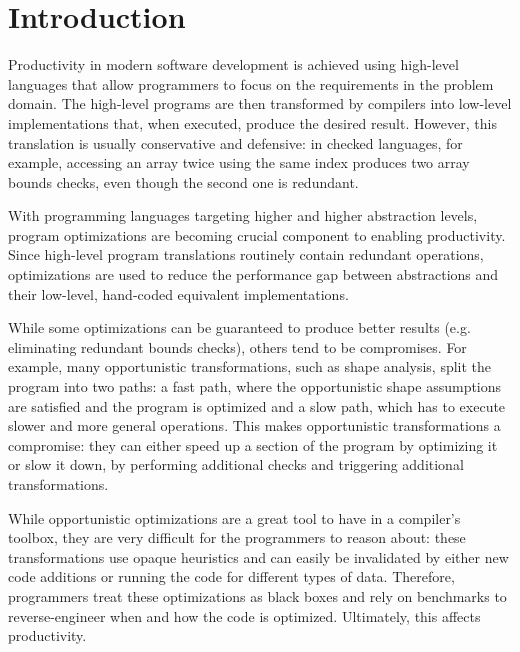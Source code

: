 \section{Introduction}
\label{sec:intro}


Productivity in modern software development is achieved using high-level languages that allow programmers to focus on the requirements in the problem domain. The high-level programs are then transformed by compilers into low-level implementations that, when executed, produce the desired result. However, this translation is usually conservative and defensive: in checked languages, for example, accessing an array twice using the same index produces two array bounds checks, even though the second one is redundant.

With programming languages targeting higher and higher abstraction levels, program optimizations are becoming crucial component to enabling productivity. Since high-level program translations routinely contain redundant operations, optimizations are used to reduce the performance gap between abstractions and their low-level, hand-coded equivalent implementations.

While some optimizations can be guaranteed to produce better results (e.g. eliminating redundant bounds checks), others tend to be compromises. For example, many opportunistic transformations, such as shape analysis, split the program into two paths: a fast path, where the opportunistic shape assumptions are satisfied and the program is optimized and a slow path, which has to execute slower and more general operations. This makes opportunistic transformations a compromise: they can either speed up a section of the program by optimizing it or slow it down, by performing additional checks and triggering additional transformations.

While opportunistic optimizations are a great tool to have in a compiler's toolbox, they are very difficult for the programmers to reason about: these transformations use opaque heuristics and can easily be invalidated by either new code additions or running the code for different types of data. Therefore, programmers treat these optimizations as black boxes and rely on benchmarks to reverse-engineer when and how the code is optimized. Ultimately, this affects productivity.

